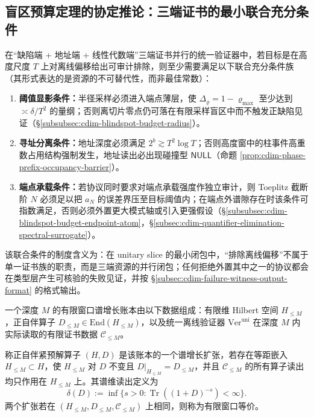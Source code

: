 \subsection{盲区预算定理的协定推论：三端证书的最小联合充分条件}\label{subsec:cdim-blindspot-budget-corollaries}
在“缺陷端 + 地址端 + 线性代数端”三端证书并行的统一验证器中，若目标是在高度尺度 \(T\) 上对离线偏移给出可审计排除，则至少需要满足以下联合充分条件族（其形式表达的是资源的不可替代性，而非最佳常数）：
\begin{enumerate}
  \item \textbf{阈值显影条件：}半径采样必须进入端点薄层，使 \(\Delta_{\varrho}=1-\varrho_{\max}\) 至少达到 \(\asymp \delta/T^2\) 的量纲；否则离切片零点仍可落在有限采样盲区中而不触发正缺陷见证（\S\ref{subsubsec:cdim-blindspot-budget-radius}）。
  \item \textbf{寻址分离条件：}地址深度必须满足 \(2^b\gtrsim T^2\log T\)；否则高度窗中的柱事件高重数占用结构强制发生，地址读出必出现碰撞型 \(\mathsf{NULL}\)（命题 \ref{prop:cdim-phase-prefix-occupancy-barrier}）。
  \item \textbf{端点承载条件：}若协议同时要求对端点承载强度作独立审计，则 Toeplitz 截断阶 \(N\) 必须足以把 \(a_N\) 的误差界压至目标阈值内；在端点外谱隙存在时该条件可指数满足，否则必须外置更大模式轴或引入更强假设（\S\ref{subsubsec:cdim-blindspot-budget-endpoint-atom}，\S\ref{subsec:cdim-quantifier-elimination-spectral-surrogate}）。
\end{enumerate}
该联合条件的制度含义为：在 unitary slice 的最小闭包中，“排除离线偏移”不属于单一证书族的职责，而是三端资源的并行闭包；任何拒绝外置其中之一的协议都会在类型层产生可核验的失败见证，并按 \S\ref{subsec:cdim-failure-witness-output-format} 的格式输出。
\begin{definition}[有限窗口谱增长账本]\label{def:distill-connes-finite-window-spectral-growth-ledger}
一个深度 \(M\) 的有限窗口谱增长账本由以下数据组成：有限维 Hilbert 空间 \(H_{\le M}\)，正自伴算子 \(D_{\le M}\in\mathrm{End}(H_{\le M})\)，以及统一离线验证器 \(\mathrm{Ver}^{\mathrm{uni}}\) 在深度 \(M\) 内实际读取的有限证书数据 \(\mathcal C_{\le M}\)。

称正自伴紧预解算子 \((H,D)\) 是该账本的一个谱增长扩张，若存在等距嵌入 \(H_{\le M}\subset H\)，使 \(H_{\le M}\) 对 \(D\) 不变且 \(D|_{H_{\le M}}=D_{\le M}\)，并且 \(\mathcal C_{\le M}\) 的所有算子读出均只作用在 \(H_{\le M}\) 上。其谱维读出定义为
\[
\delta(D):=\inf\{s>0:\operatorname{Tr}((1+D)^{-s})<\infty\}.
\]
两个扩张若在 \((H_{\le M},D_{\le M},\mathcal C_{\le M})\) 上相同，则称为有限窗口等价。
\end{definition}

